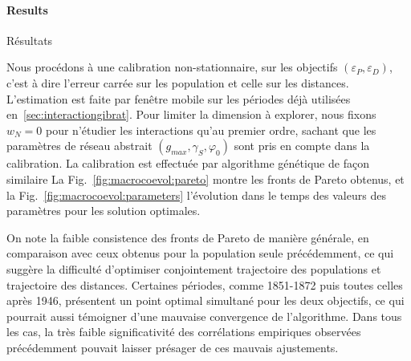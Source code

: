 



\paragraph{Results}{Résultats}


Nous procédons à une calibration non-stationnaire, sur les objectifs $(\varepsilon_P,\varepsilon_D)$, c'est à dire l'erreur carrée sur les population et celle sur les distances. L'estimation est faite par fenêtre mobile sur les périodes déjà utilisées en~\ref{sec:interactiongibrat}. Pour limiter la dimension à explorer, nous fixons $w_N = 0$ pour n'étudier les interactions qu'au premier ordre, sachant que les paramètres de réseau abstrait $(g_{max},\gamma_S,\varphi_0)$ sont pris en compte dans la calibration. La calibration est effectuée par algorithme génétique de façon similaire La Fig.~\ref{fig:macrocoevol:pareto} montre les fronts de Pareto obtenus, et la Fig.~\ref{fig:macrocoevol:parameters} l'évolution dans le temps des valeurs des paramètres pour les solution optimales.


On note la faible consistence des fronts de Pareto de manière générale, en comparaison avec ceux obtenus pour la population seule précédemment, ce qui suggère la difficulté d'optimiser conjointement trajectoire des populations et trajectoire des distances. Certaines périodes, comme 1851-1872 puis toutes celles après 1946, présentent un point optimal simultané pour les deux objectifs, ce qui pourrait aussi témoigner d'une mauvaise convergence de l'algorithme. Dans tous les cas, la très faible significativité des corrélations empiriques observées précédemment pouvait laisser présager de ces mauvais ajustements.


